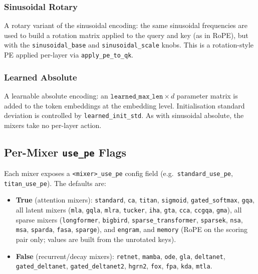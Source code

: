\subsubsection{Sinusoidal Rotary}

A rotary variant of the sinusoidal encoding: the same sinusoidal
frequencies are used to build a rotation matrix applied to the query
and key (as in RoPE), but with the \texttt{sinusoidal\_base} and
\texttt{sinusoidal\_scale} knobs. This is a rotation-style PE applied
per-layer via \texttt{apply\_pe\_to\_qk}.

\subsubsection{Learned Absolute}

A learnable absolute encoding: an
$\texttt{learned\_max\_len} \times d$ parameter matrix is added to the
token embeddings at the embedding level. Initialisation standard
deviation is controlled by \texttt{learned\_init\_std}. As with
sinusoidal absolute, the mixers take no per-layer action.

\subsection{Per-Mixer \texttt{use\_pe} Flags}

Each mixer exposes a \texttt{<mixer>\_use\_pe} config field
(e.g.\ \texttt{standard\_use\_pe}, \texttt{titan\_use\_pe}).
The defaults are:

\begin{itemize}
\item \textbf{True} (attention mixers): \texttt{standard}, \texttt{ca},
  \texttt{titan}, \texttt{sigmoid},
  \texttt{gated\_softmax}, \texttt{gqa}, all latent mixers
  (\texttt{mla}, \texttt{gqla}, \texttt{mlra},
  \texttt{tucker}, \texttt{iha}, \texttt{gta},
  \texttt{cca}, \texttt{ccgqa}, \texttt{gma}), all
  sparse mixers (\texttt{longformer}, \texttt{bigbird},
  \texttt{sparse\_transformer}, \texttt{sparsek},
  \texttt{nsa}, \texttt{msa}, \texttt{sparda},
  \texttt{fasa}, \texttt{sparge}), and
  \texttt{engram}, and \texttt{memory} (RoPE on the scoring pair
  only; values are built from the unrotated keys).
\item \textbf{False} (recurrent/decay mixers): \texttt{retnet},
  \texttt{mamba}, \texttt{ode},
  \texttt{gla}, \texttt{deltanet},
  \texttt{gated\_deltanet}, \texttt{gated\_deltanet2},
  \texttt{hgrn2}, \texttt{fox}, \texttt{fpa}, \texttt{kda},
  \texttt{mtla}.
\end{itemize}

